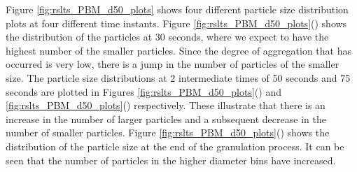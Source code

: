 \documentclass[preprint,11pt,authoryear]{elsarticle}
\begin{document}
Figure \ref{fig:rslts_PBM_d50_plots} shows four different particle size distribution plots at four 
different time instants. Figure \ref{fig:rslts_PBM_d50_plots}() shows the distribution of 
the particles at 30 seconds, where we expect to have the highest number of the smaller particles. 
Since the degree of aggregation that has occurred is very low, there is a jump in the number of 
particles of the smaller size. The particle size distributions at 2 intermediate times of 50 seconds and 
75 seconds are plotted in Figures \ref{fig:rslts_PBM_d50_plots}() and 
\ref{fig:rslts_PBM_d50_plots}() respectively. These illustrate that there is an increase in 
the number of larger particles  and a subsequent decrease in the number of smaller particles. 
Figure \ref{fig:rslts_PBM_d50_plots}() shows the distribution 
of the particle size at the end of the granulation process. It can be seen that the number of particles in 
the higher diameter bins have increased.
\end{document}
